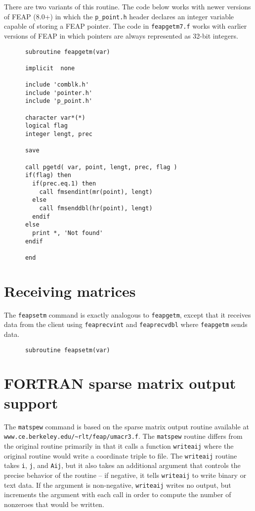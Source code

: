 There are two variants of this routine.  The code below works with
newer versions of FEAP (8.0+) in which the {\tt p\_point.h} header
declares an integer variable capable of storing a FEAP pointer.
The code in {\tt feapgetm7.f} works with earlier versions of FEAP
in which pointers are always represented as 32-bit integers.

\begin{verbatim}
      subroutine feapgetm(var)

      implicit  none

      include 'comblk.h'
      include 'pointer.h'
      include 'p_point.h'

      character var*(*)
      logical flag
      integer lengt, prec

      save

      call pgetd( var, point, lengt, prec, flag )
      if(flag) then
        if(prec.eq.1) then
          call fmsendint(mr(point), lengt)
        else
          call fmsenddbl(hr(point), lengt)
        endif
      else
        print *, 'Not found'
      endif

      end
\end{verbatim}
\section{Receiving matrices}

The {\tt feapsetm} command is exactly analogous to {\tt feapgetm},
except that it receives data from the client using {\tt feaprecvint}
and {\tt feaprecvdbl} where {\tt feapgetm} sends data. 

\begin{verbatim}
      subroutine feapsetm(var)
\end{verbatim}
\section{FORTRAN sparse matrix output support}

The {\tt matspew} command is based on the sparse matrix output
routine available at {\tt www.ce.berkeley.edu/\~{}rlt/feap/umacr3.f}.
The {\tt matspew} routine differs from the original routine
primarily in that it calls a function {\tt writeaij} where the
original routine would write a coordinate triple to file.
The {\tt writeaij} routine takes {\tt i}, {\tt j}, and {\tt Aij},
but it also takes an additional argument that controls the precise
behavior of the routine -- if negative, it tells {\tt writeaij}
to write binary or text data.  If the argument is non-negative,
{\tt writeaij} writes no output, but increments the argument with
each call in order to compute the number of nonzeroes that would
be written.

